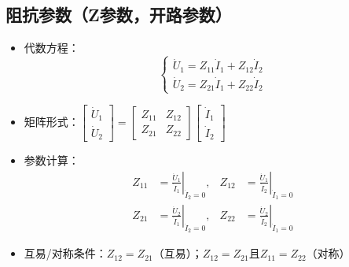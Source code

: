\subsection{阻抗参数（Z参数，开路参数）}
\begin{itemize}
    \item 代数方程：
    \[
    \begin{cases} 
    \dot{U}_1 = Z_{11}\dot{I}_1 + Z_{12}\dot{I}_2 \\ 
    \dot{U}_2 = Z_{21}\dot{I}_1 + Z_{22}\dot{I}_2 
    \end{cases}
    \]
    \item 矩阵形式：$\begin{bmatrix} \dot{U}_1 \\ \dot{U}_2 \end{bmatrix} = \begin{bmatrix} Z_{11} & Z_{12} \\ Z_{21} & Z_{22} \end{bmatrix}\begin{bmatrix} \dot{I}_1 \\ \dot{I}_2 \end{bmatrix}$
    \item 参数计算：
    \[
    \begin{aligned}
    Z_{11} &= \left. \frac{\dot{U}_1}{\dot{I}_1} \right|_{\dot{I}_2 = 0}, & Z_{12} &= \left. \frac{\dot{U}_1}{\dot{I}_2} \right|_{\dot{I}_1 = 0} \\
    Z_{21} &= \left. \frac{\dot{U}_2}{\dot{I}_1} \right|_{\dot{I}_2 = 0}, & Z_{22} &= \left. \frac{\dot{U}_2}{\dot{I}_2} \right|_{\dot{I}_1 = 0}
    \end{aligned}
    \]
    \item 互易/对称条件：$Z_{12}=Z_{21}$（互易）；$Z_{12}=Z_{21}$且$Z_{11}=Z_{22}$（对称）
\end{itemize}

